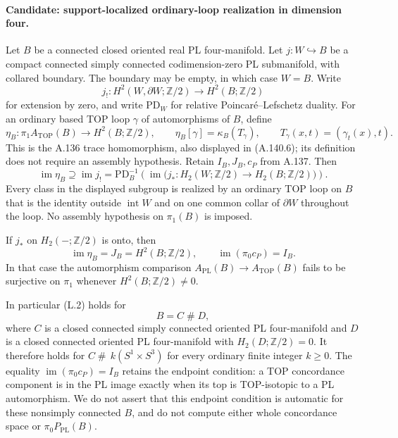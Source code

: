 \paragraph{Candidate: support-localized ordinary-loop realization in dimension four.}
Let $B$ be a connected closed oriented real PL four-manifold.
Let $j:W\hookrightarrow B$ be a compact connected simply connected
codimension-zero PL submanifold, with collared boundary. The boundary
may be empty, in which case $W=B$. Write
\[
 j_!:H^2(W,\partial W;\mathbb Z/2)
                \longrightarrow H^2(B;\mathbb Z/2)
\]
for extension by zero, and write $\mathrm{PD}_W$ for relative
Poincar\'e--Lefschetz duality. For an ordinary based TOP loop
$\gamma$ of automorphisms of $B$, define
\[
 \eta_B:\pi_1 A_{\mathrm{TOP}}(B)\longrightarrow H^2(B;\mathbb Z/2),
 \qquad \eta_B[\gamma]=\kappa_B(T_\gamma),
 \qquad T_\gamma(x,t)=(\gamma_t(x),t).
\]
This is the A.136 trace homomorphism, also displayed in
(A.140.6); its definition does not require an assembly hypothesis.
Retain $I_B,J_B,c_P$ from A.137.
Then
\[
 \operatorname{im}\eta_B\supseteq\operatorname{im}j_!
   =\mathrm{PD}_B^{-1}\!\left(
       \operatorname{im}\bigl(j_*:H_2(W;\mathbb Z/2)
                            \to H_2(B;\mathbb Z/2)\bigr)\right).
                                                               \tag{L.1}
\]
Every class in the displayed subgroup is realized by an ordinary
TOP loop on $B$ that is the identity outside $\operatorname{int}W$
and on one common collar of $\partial W$ throughout the loop.
No assembly hypothesis on $\pi_1(B)$ is imposed.

If $j_*$ on $H_2(-;\mathbb Z/2)$ is onto, then
\[
 \operatorname{im}\eta_B=J_B=H^2(B;\mathbb Z/2),
 \qquad
 \operatorname{im}(\pi_0c_P)=I_B.                    \tag{L.2}
\]
In that case the automorphism comparison
$A_{\mathrm{PL}}(B)\to A_{\mathrm{TOP}}(B)$ fails to be
surjective on $\pi_1$ whenever $H^2(B;\mathbb Z/2)\ne0$.

In particular (L.2) holds for
\[
 B=C\mathbin{\#}D,
\]
where $C$ is a closed connected simply connected oriented PL
four-manifold and $D$ is a closed connected oriented PL
four-manifold with $H_2(D;\mathbb Z/2)=0$. It therefore holds for
$C\mathbin{\#}\,k(S^1\times S^3)$ for every ordinary finite
integer $k\ge0$.
The equality $\operatorname{im}(\pi_0c_P)=I_B$ retains the
endpoint condition: a TOP concordance component is in the PL
image exactly when its top is TOP-isotopic to a PL automorphism.
We do not assert that this endpoint condition is automatic for
these nonsimply connected $B$, and do not compute either whole
concordance space or $\pi_0P_{\mathrm{PL}}(B)$.

